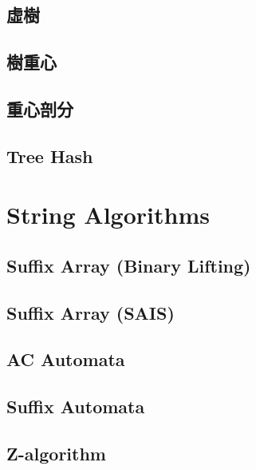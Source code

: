 \documentclass[a4paper,10pt,twocolumn,oneside]{article}
\newcommand{\inputcpp}[1]{}  %
\begin{document}
\subsection{虛樹}
\inputcpp{tree_algorithm/virTree.cpp}

\subsection{樹重心}
\inputcpp{tree_algorithm/find_centroid.cpp}

\subsection{重心剖分}
\inputcpp{tree_algorithm/centroid_decomp.cpp}

\subsection{Tree Hash}
\inputcpp{tree_algorithm/tree_hash.cpp}


\section{String Algorithms}

\subsection{Suffix Array (Binary Lifting)}
\inputcpp{string/SA.cpp}

\subsection{Suffix Array (SAIS)}
\inputcpp{string/SAIS.cpp}

\subsection{AC Automata}
\inputcpp{string/ACAutomata.cpp}

\subsection{Suffix Automata}
\inputcpp{string/SuffixAutomata.cpp}

\subsection{Z-algorithm}
\inputcpp{string/z_algorithm.cpp}
\end{document}
